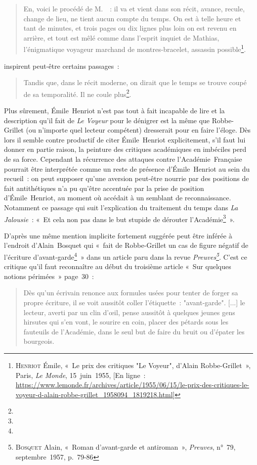\begin{quote}
    En, voici le procédé de M.~\robbe~: il va et vient dans son récit, avance, recule, change de lieu, ne tient aucun compte du temps. On est à telle heure et tant de minutes, et trois pages ou dix lignes plus loin on est revenu en arrière, et tout est mêlé comme dans l'esprit inquiet de Mathias, l'énigmatique voyageur marchand de montres-bracelet, assassin possible\footnote{\op\textsc{Henriot} Émile, «~Le prix des critiques "Le Voyeur", d'Alain Robbe-Grillet~», Paris, \textit{Le Monde}, 15~juin~1955, [En ligne~: \href{https://www.lemonde.fr/archives/article/1955/06/15/le-prix-des-critiques-le-voyeur-d-alain-robbe-grillet_1958094_1819218.html}{https://www.lemonde.fr/archives/article/1955/06/15/le-prix-des-critiques-le-voyeur-d-alain-robbe-grillet\_1958094\_1819218.html}]}.
\end{quote}
inspirent peut-être certains passages~:
\begin{quote}
    Tandis que, dans le récit moderne, on dirait que le temps se trouve coupé de sa temporalité. Il ne coule plus\footnote{}.
\end{quote}
Plus sûrement, Émile~Henriot n'est pas tout à fait incapable de lire et la description qu'il fait de \textit{Le Voyeur} pour le dénigrer est la même que Robbe-Grillet (ou n'importe quel lecteur compétent) dresserait pour en faire l'éloge. Dès lors il semble contre productif de citer Émile~Henriot explicitement, s'il faut lui donner en partie raison, la peinture des critiques académiques en imbéciles perd de sa force. Cependant la récurrence des attaques contre l'Académie~Française pourrait être interprétée comme un reste de présence d'Émile~Henriot au sein du recueil~: on peut supposer qu'une aversion peut-être nourrie par des positions de fait antithétiques n'a pu qu'être accentuée par la prise de position d'Émile~Henriot, au moment où \robbe{} accédait à un semblant de reconnaissance. Notamment ce passage qui suit l'explication du traitement du temps dans \textit{La Jalousie}~: «~Et cela non pas dans le but stupide de dérouter l'Académie\footnote{}~».

D'après \galia{} une même mention implicite fortement suggérée peut être inférée à l'endroit d'Alain~Bosquet qui «~fait de Robbe-Grillet un cas de figure négatif de l’écriture d’avant-garde\footnote{}~» dans un article paru dans la revue \textit{Preuves\footnote{\textsc{Bosquet} Alain, «~Roman d’avant-garde et antiroman~», \textit{Preuves}, n°~79, septembre~1957, p.~79-86}}. C'est ce critique qu'il faut reconnaître au début du troisième article «~Sur quelques notions périmées~» page~30~:
\begin{quote}
    Dès qu'un écrivain renonce aux formules usées pour tenter de forger sa propre écriture, il se voit aussitôt coller l'étiquette~: "avant-garde". [...] le lecteur, averti par un clin d'œil, pense aussitôt à quelques jeunes gens hirsutes qui s'en vont, le sourire en coin, placer des pétards sous les fauteuils de l'Académie, dans le seul but de faire du bruit ou d'épater les bourgeois.
\end{quote}

